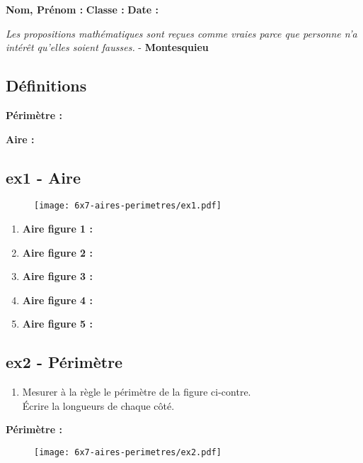 



\textbf{Nom, Prénom :} \hspace{8cm} \textbf{Classe :} \hspace{3cm} \textbf{Date :}\\

\begin{center}
  \textit{Les propositions mathématiques sont reçues comme vraies parce que personne n’a intérêt qu’elles soient fausses.} - \textbf{Montesquieu}
\end{center}

\subsection*{Définitions}

\textbf{Périmètre : } \dotfill \\ \Pointilles[1] 

\textbf{Aire : } \dotfill \\ \Pointilles[1] 

\subsection*{ex1 - Aire}

\begin{figure}[H]
  \centering
  \texttt{[image: 6x7-aires-perimetres/ex1.pdf]}
\end{figure}

\begin{enumerate}
  \item[1.] \textbf{Aire figure 1 :} \dotfill
  \item[2.] \textbf{Aire figure 2 : } \dotfill
  \item[3.] \textbf{Aire figure 3 : } \dotfill
  \item[4.] \textbf{Aire figure 4 : } \dotfill
  \item[5.] \textbf{Aire figure 5 : } \dotfill
\end{enumerate}

\subsection*{ex2 - Périmètre}

\begin{multicols}{2} 
\begin{enumerate}
  \item[1.] Mesurer à la règle le périmètre de la figure ci-contre. \\
  Écrire la longueurs de chaque côté.
\end{enumerate}

\textbf{Périmètre : } \dotfill \columnbreak

  \begin{figure}[H]
    \centering
    \texttt{[image: 6x7-aires-perimetres/ex2.pdf]}
  \end{figure}
\end{multicols}


